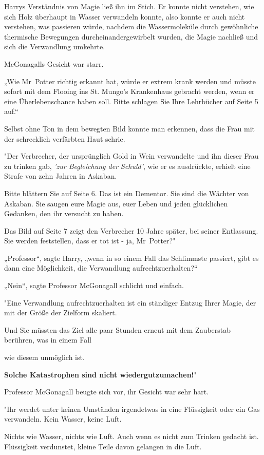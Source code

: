 {Harrys Verständnis von Magie ließ ihn im Stich. Er konnte nicht verstehen, wie sich Holz überhaupt in Wasser verwandeln konnte, also konnte er auch nicht verstehen, was passieren würde, nachdem die Wassermoleküle durch gewöhnliche thermische Bewegungen durcheinandergewirbelt wurden, die Magie nachließ und sich die Verwandlung umkehrte.

McGonagalls Gesicht war starr.

„Wie Mr~Potter richtig erkannt hat, würde er extrem krank werden und müsste sofort mit dem Flooing ins St. Mungo's Krankenhaus gebracht werden, wenn er eine Überlebenschance haben soll. Bitte schlagen Sie Ihre Lehrbücher auf Seite 5 auf.“

Selbst ohne Ton in dem bewegten Bild konnte man erkennen, dass die Frau mit der schrecklich verfärbten Haut schrie.

"Der Verbrecher, der ursprünglich Gold in Wein verwandelte und ihn dieser Frau zu trinken gab, \emph{'zur Begleichung der Schuld'}, wie er es ausdrückte, erhielt eine Strafe von zehn Jahren in Askaban.

Bitte blättern Sie auf Seite 6. Das ist ein Dementor. Sie sind die Wächter von Askaban. Sie saugen eure Magie aus, euer Leben und jeden glücklichen Gedanken, den ihr versucht zu haben.

Das Bild auf Seite 7 zeigt den Verbrecher 10 Jahre später, bei seiner Entlassung. Sie werden feststellen, dass er tot ist - ja, Mr~Potter?"

„Professor“, sagte Harry, „wenn in so einem Fall das Schlimmste passiert, gibt es dann eine Möglichkeit, die Verwandlung aufrechtzuerhalten?“

„Nein“, sagte Professor McGonagall schlicht und einfach.

"Eine Verwandlung aufrechtzuerhalten ist ein ständiger Entzug Ihrer Magie, der mit der Größe der Zielform skaliert.

Und Sie müssten das Ziel alle paar Stunden erneut mit dem Zauberstab berühren, was in einem Fall

wie diesem unmöglich ist.

\textbf{Solche Katastrophen sind nicht wiedergutzumachen!}"

Professor McGonagall beugte sich vor, ihr Gesicht war sehr hart.

"Ihr werdet unter keinen Umständen irgendetwas in eine Flüssigkeit oder ein Gas verwandeln. Kein Wasser, keine Luft.

Nichts wie Wasser, nichts wie Luft. Auch wenn es nicht zum Trinken gedacht ist. Flüssigkeit verdunstet, kleine Teile davon gelangen in die Luft.

}
